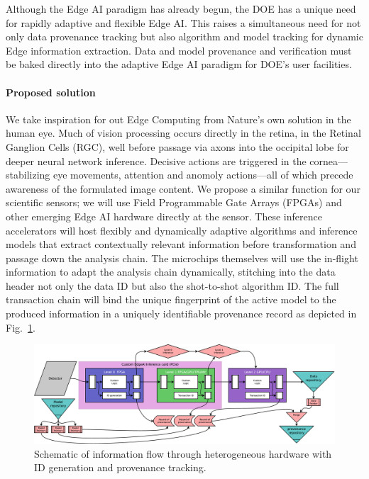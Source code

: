 \documentclass{article}
\begin{document}
Although the Edge AI paradigm has already begun, the DOE has a unique need for rapidly adaptive and flexible Edge AI.
This raises a simultaneous need for not only data provenance tracking but also algorithm and model tracking for dynamic Edge information extraction.
Data and model provenance and verification must be baked directly into the adaptive Edge AI paradigm for DOE's user facilities.

\paragraph{Proposed solution}
We take inspiration for out Edge Computing from Nature's own solution in the human eye.
Much of vision processing occurs directly in the retina, in the Retinal Ganglion Cells (RGC), well before passage via axons into the occipital lobe for deeper neural network inference.
Decisive actions are triggered in the cornea---stabilizing eye movements, attention and anomoly actions---all of which precede awareness of the formulated image content.
We propose a similar function for our scientific sensors; we will use Field Programmable Gate Arrays (FPGAs) and other emerging Edge AI hardware \cite{edgetpu_benchmarks,edgetpu,waveCGRA,CGRAreview,seaofcores} directly at the sensor.
These inference accelerators will host flexibly and dynamically adaptive algorithms and inference models that extract contextually relevant information before transformation and passage down the analysis chain.
The microchips themselves will use the in-flight information to adapt the analysis chain dynamically, stitching into the data header not only the data ID but also the shot-to-shot algorithm ID.
The full transaction chain will bind the unique fingerprint of the active model to the produced information in a uniquely identifiable provenance record as depicted in Fig.~\ref{fig::EdgeFlow}.

\begin{figure}
	\centerline{\includegraphics[clip,width=.75\linewidth]{EdgeFlow.eps}}
	\caption{
		\label{fig::EdgeFlow}
		Schematic of information flow through heterogeneous hardware with ID generation and provenance tracking.
		}
\end{figure}
\end{document}
